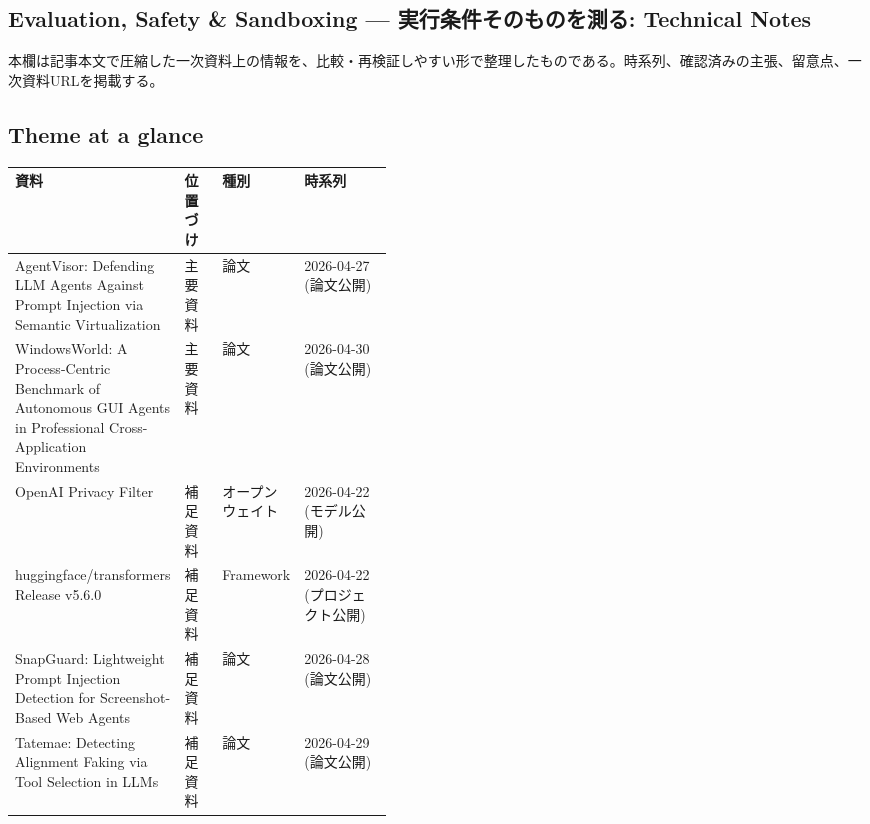 \subsection*{Evaluation, Safety \& Sandboxing — 実行条件そのものを測る: Technical Notes}
本欄は記事本文で圧縮した一次資料上の情報を、比較・再検証しやすい形で整理したものである。時系列、確認済みの主張、留意点、一次資料URLを掲載する。
\medskip
\subsection*{Theme at a glance}
\begin{center}
\footnotesize
\begin{tabularx}{\linewidth}{@{}p{0.20\linewidth}p{0.10\linewidth}p{0.14\linewidth}X@{}}
\toprule
資料 & 位置づけ & 種別 & 時系列 \\
\midrule
AgentVisor: Defending LLM Agents Against Prompt Injection via Semantic Virtualization & 主要資料 & 論文 & 2026-04-27 (論文公開) \\
WindowsWorld: A Process-Centric Benchmark of Autonomous GUI Agents in Professional Cross-Application Environments & 主要資料 & 論文 & 2026-04-30 (論文公開) \\
OpenAI Privacy Filter & 補足資料 & オープンウェイト & 2026-04-22 (モデル公開) \\
huggingface/transformers Release v5.6.0 & 補足資料 & Framework & 2026-04-22 (プロジェクト公開) \\
SnapGuard: Lightweight Prompt Injection Detection for Screenshot-Based Web Agents & 補足資料 & 論文 & 2026-04-28 (論文公開) \\
Tatemae: Detecting Alignment Faking via Tool Selection in LLMs & 補足資料 & 論文 & 2026-04-29 (論文公開) \\
\bottomrule
\end{tabularx}
\end{center}
\normalsize

